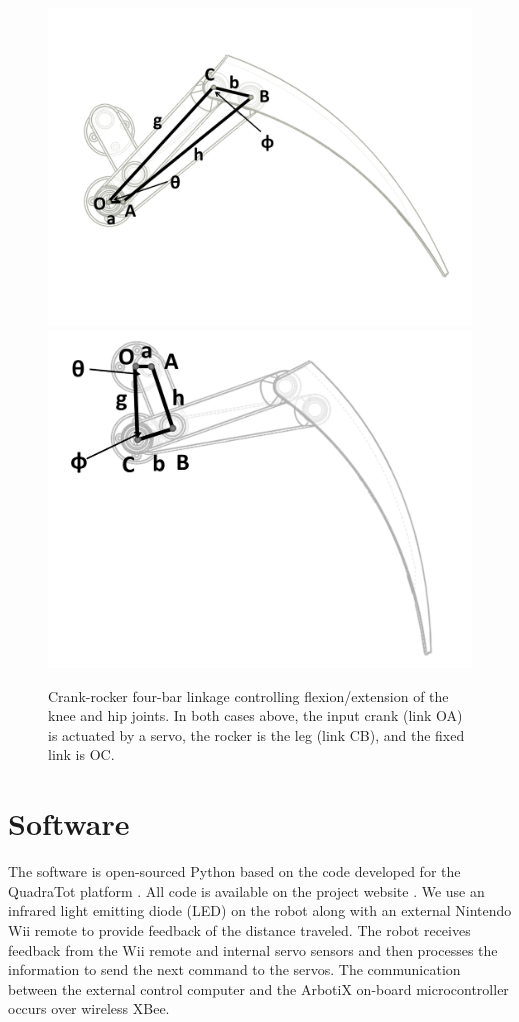 \documentclass[letterpaper]{article}
\begin{document}
\begin{figure}[t]
\begin{center}
\includegraphics[width=.23\textwidth]{fig3.pdf}
\includegraphics[width=.23\textwidth]{fig4.pdf}
\caption{Crank-rocker four-bar linkage controlling flexion/extension of
  the knee and hip joints. In both cases above, the input crank (link
  OA) is actuated by a servo, the rocker is the leg (link CB), and the
  fixed link is OC.}
\label{crankRocker}
\end{center}
\end{figure}







\section{Software}

The software is open-sourced Python based on the
code developed for the QuadraTot platform \citep{yosinski2011gaits}. All code is
available on the project website \citep{WEB}. We use an infrared light
emitting diode (LED) on the robot along with an external Nintendo Wii
remote to provide feedback of the distance traveled. The robot
receives feedback from the Wii remote and internal servo sensors and
then processes the information to send the next command to
the servos. The communication between the external control computer
and the ArbotiX on-board microcontroller occurs over wireless XBee.

\begin{table}[h]
\vskip 0.25cm
\caption{Estimated total cost. The cost of components and printing material reflect market prices from March 2012. A complete parts list is on our website \citep{WEB}.}
\label{tab:cost}
\end{table}
\end{document}
